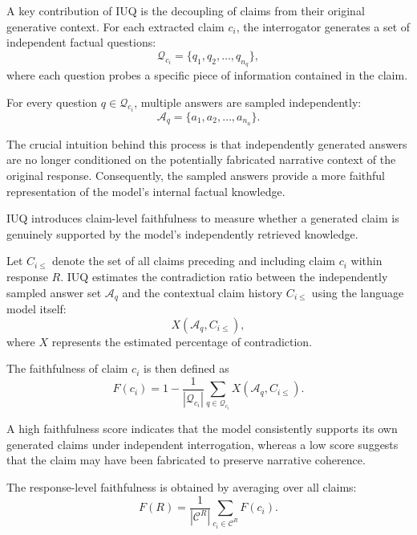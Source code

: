 A key contribution of IUQ is the decoupling of claims from their original generative context. For each extracted claim $c_i$, the interrogator generates a set of independent factual questions:
\begin{equation}
\mathcal{Q}_{c_i}=\{q_1,q_2,\dots,q_{n_q}\},
\end{equation}
where each question probes a specific piece of information contained in the claim.

For every question $q\in\mathcal{Q}_{c_i}$, multiple answers are sampled independently:
\begin{equation}
\mathcal{A}_{q}=\{a_1,a_2,\dots,a_{n_a}\}.
\end{equation}

The crucial intuition behind this process is that independently generated answers are no longer conditioned on the potentially fabricated narrative context of the original response. Consequently, the sampled answers provide a more faithful representation of the model's internal factual knowledge.


IUQ introduces claim-level faithfulness to measure whether a generated claim is genuinely supported by the model's independently retrieved knowledge.

Let $C_{i\leq}$ denote the set of all claims preceding and including claim $c_i$ within response $R$. IUQ estimates the contradiction ratio between the independently sampled answer set $\mathcal{A}_q$ and the contextual claim history $C_{i\leq}$ using the language model itself:
\begin{equation}
X(\mathcal{A}_q,C_{i\leq}),
\end{equation}
where $X$ represents the estimated percentage of contradiction.

The faithfulness of claim $c_i$ is then defined as
\begin{equation}
F(c_i)=1-\frac{1}{|\mathcal{Q}_{c_i}|}
\sum_{q\in\mathcal{Q}_{c_i}}
X(\mathcal{A}_q,C_{i\leq}).
\end{equation}

A high faithfulness score indicates that the model consistently supports its own generated claims under independent interrogation, whereas a low score suggests that the claim may have been fabricated to preserve narrative coherence.

The response-level faithfulness is obtained by averaging over all claims:
\begin{equation}
F(R)=\frac{1}{|\mathcal{C}^{R}|}
\sum_{c_i\in\mathcal{C}^{R}}F(c_i).
\end{equation}


